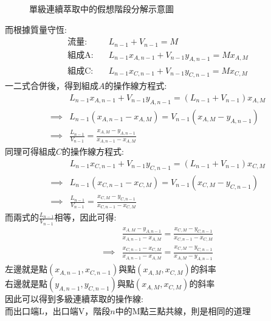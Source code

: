 \documentclass[../main.tex]{subfiles}
\begin{document}
\begin{itemize}
\begin{figure}[H]
    \caption{單級連續萃取中的假想階段分解示意圖}
  \end{figure}
  而根據質量守恆:
  \begin{align}
    \text{流量}:\quad &L_{n-1}+V_{n-1}=M\\
    \text{組成A}:\quad &L_{n-1}x_{A,n-1}+V_{n-1}y_{A,n-1}=Mx_{A,M}\\
    \text{組成C}:\quad &L_{n-1}x_{C,n-1}+V_{n-1}y_{C,n-1}=Mx_{C,M}
  \end{align}
  一二式合併後，得到組成$A$的操作線方程式:
  \begin{align}
    &L_{n-1}x_{A,n-1}+V_{n-1}y_{A,n-1}=(L_{n-1}+V_{n-1})x_{A,M} \nonumber\\
    \implies&L_{n-1}(x_{A,n-1}-x_{A,M})=V_{n-1}(x_{A,M}-y_{A,n-1}) \nonumber\\
    \implies&\frac{L_{n-1}}{V_{n-1}}=\frac{x_{A,M}-y_{A,n-1}}{x_{A,n-1}-x_{A,M}}
  \end{align}
  同理可得組成$C$的操作線方程式:
  \begin{align}
    &L_{n-1}x_{C,n-1}+V_{n-1}y_{C,n-1}=(L_{n-1}+V_{n-1})x_{C,M} \nonumber\\
    \implies&L_{n-1}(x_{C,n-1}-x_{C,M})=V_{n-1}(x_{C,M}-y_{C,n-1}) \nonumber\\
    \implies&\frac{L_{n-1}}{V_{n-1}}=\frac{x_{C,M}-y_{C,n-1}}{x_{C,n-1}-x_{C,M}}
  \end{align}
  而兩式的$\frac{L_{n-1}}{V_{n-1}}$相等，因此可得:
  \begin{align}
    &\frac{x_{A,M}-y_{A,n-1}}{x_{A,n-1}-x_{A,M}}=\frac{x_{C,M}-y_{C,n-1}}{x_{C,n-1}-x_{C,M}} \nonumber\\
    \implies&
    \frac{x_{C,n-1}-x_{C,M}}{x_{A,n-1}-x_{A,M}}=
    \frac{x_{C,M}-y_{C,n-1}}{x_{A,M}-y_{A,n-1}}
  \end{align}
  左邊就是點$(x_{A,n-1},x_{C,n-1})$與點$(x_{A,M},x_{C,M})$的斜率\\
  右邊就是點$(y_{A,n-1},y_{C,n-1})$與點$(x_{A,M},x_{C,M})$的斜率\\
  因此可以得到多級連續萃取的操作線:
  \\
  而出口端L，出口端V，階段$n$中的M點三點共線，則是相同的道理

\end{itemize}
\end{document}
